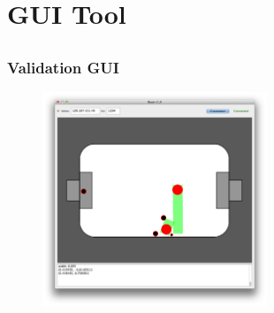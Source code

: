 \documentclass[hyperref={pdfpagelabels=false}]{beamer}
\begin{document}
\section{GUI Tool}
\subsection{}
\begin{frame}
    \frametitle{Validation GUI}
    \begin{figure}
        \center
        \includegraphics[width=0.6\textwidth]{Pictures/gui-1}
    \end{figure}

\end{frame}
\end{document}

